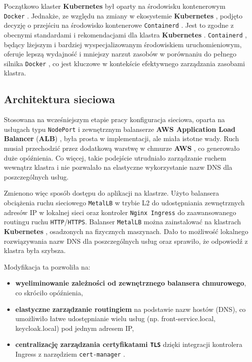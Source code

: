 Początkowo klaster \textbf{Kubernetes} \cite{kubernetes} był oparty na środowisku kontenerowym \texttt{Docker} \cite{docker_docs}. Jednakże, ze względu na zmiany w ekosystemie \textbf{Kubernetes} \cite{kubernetes}, podjęto decyzję o przejściu na środowisko kontenerowe \texttt{Containerd} \cite{containerd_docs}. Jest to zgodne z obecnymi standardami i rekomendacjami dla klastra \textbf{Kubernetes} \cite{kubernetes}. \texttt{Containerd} \cite{containerd_docs}, będący lżejszym i bardziej wyspecjalizowanym środowiskiem uruchomieniowym, oferuje lepszą wydajność i mniejszy narzut zasobów w porównaniu do pełnego silnika \texttt{Docker} \cite{docker_docs}, co jest kluczowe w kontekście efektywnego zarządzania zasobami klastra.

\subsection{Architektura sieciowa}

Stosowana na wcześniejszym etapie pracy konfiguracja sieciowa, oparta na usługach typu \texttt{NodePort} \cite{nodeport_docs} i zewnętrznym balanserze \textbf{AWS Application Load Balancer} (\textbf{ALB}) \cite{alb_docs}, była prosta w implementacji, ale miała istotne wady. Ruch musiał przechodzić przez dodatkową warstwę w chmurze \textbf{AWS} \cite{aws_docs}, co generowało duże opóźnienia. Co więcej, takie podejście utrudniało zarządzanie ruchem wewnątrz klastra i nie pozwalało na elastyczne wykorzystanie nazw DNS dla poszczególnych usług.

Zmienono więc sposób dostępu do aplikacji na klastrze. Użyto balansera obciążenia ruchu sieciowego \texttt{MetalLB} \cite{metallb_docs} w trybie L2 do udostępniania zewnętrznych adresów IP w lokalnej sieci oraz kontroler \texttt{Nginx Ingress} \cite{nginx_ingress_docs} do zaawansowanego routingu ruchu \texttt{HTTP}/\texttt{HTTPS}. Balanser \texttt{MetalLB} \cite{metallb_docs} można zainstalować na klastrach \textbf{Kubernetes} \cite{kubernetes}, osadzonych na fizycznych maszynach. Dało to możliwość lokalnego rozwiązywania nazw DNS dla poszczególnych usług oraz sprawiło, że odpowiedź z klastra była szybsza.

\newpage

Modyfikacja ta pozwoliła na:
\begin{itemize}
    \item \textbf{wyeliminowanie zależności od zewnętrznego balansera chmurowego}, co skróciło opóźnienia,
    \item \textbf{elastyczne zarządzanie routingiem} na podstawie nazw hostów (DNS), co umożliwiło łatwe udostępnianie wielu usług (np. front-service.local, keycloak.local) pod jednym adresem IP,
    \item \textbf{centralizację zarządzania certyfikatami \texttt{TLS}} dzięki integracji kontrolera Ingress z narzędziem \texttt{cert-manager} \cite{cert_manager_docs}.
\end{itemize}

